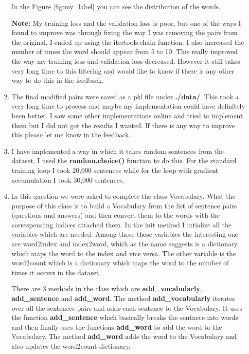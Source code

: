 \documentclass[a4paper]{article}
\begin{document}
\begin{enumerate}
          In the Figure \ref{fig:my_label} you can see the distribution of the words.

          \textbf{Note:} My training loss and the validation loss is poor, but one of the ways I found to improve was through fixing the way I was removing the pairs from the original. I ended up using the itertools.chain function. I also increased the number of times the word should appear from 5 to 10. This really improved the way my training loss and validation loss decreased. However it still takes very long time to this filtering and would like to know if there is any other way to do this in the feedback.
    \item The final modified pairs were saved as a pkl file under \textbf{./data/}. This took a very long time to process and maybe my implementation could have definitely been better. I saw some other implementations online and tried to implement them but I did not got the results I wanted. If there is any way to improve this please let me know in the feedback.
    \item I have implemented a way in which it takes random sentences from the dataset. I used the \textbf{random.choice()} function to do this. For the standard training loop I took 20,000 sentences while for the loop with gradient accumulation I took 30,000 sentences.
    \item In this question we were asked to complete the class Vocabulary. What the purpose of this class is to build a Vocabulary from the list of sentence pairs (questions and answers) and then convert them to the words with the corresponding indices attached them. In the init method I intialize all the variables which are needed. Among those those variables the interesting one are word2index and index2word, which as the name suggests is a dictionary which maps the word to the index and vice versa. The other variable is the word2count which is a dictionary which maps the word to the number of times it occurs in the dataset.

          There are 3 methods in the class which are \textbf{add\_vocabularly}, \textbf{add\_sentence} and \textbf{add\_word}. The method \textbf{add\_vocabularly} iterates over all the sentences pairs and adds each sentence to the Vocabulary. It uses the function \textbf{add\_sentence} which basically breaks the sentnece into words and then finally uses the functions \textbf{add\_word} to add the word to the Vocabulary. The method \textbf{add\_word} adds the word to the Vocabulary and also updates the word2count dictionary.
\end{enumerate}
\end{document}
